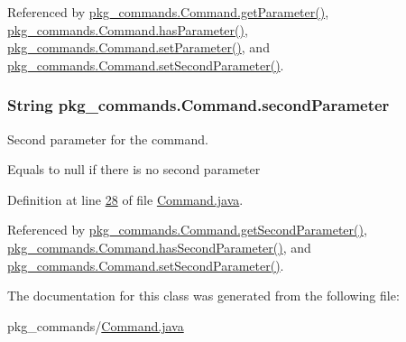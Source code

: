 Referenced by \hyperlink{Command_8java_source_l00041}{pkg\-\_\-commands.\-Command.\-get\-Parameter()}, \hyperlink{Command_8java_source_l00073}{pkg\-\_\-commands.\-Command.\-has\-Parameter()}, \hyperlink{Command_8java_source_l00057}{pkg\-\_\-commands.\-Command.\-set\-Parameter()}, and \hyperlink{Command_8java_source_l00065}{pkg\-\_\-commands.\-Command.\-set\-Second\-Parameter()}.

\hypertarget{classpkg__commands_1_1Command_a5f0b6df5ba798c9ee4446f01a0352210}{
\subsubsection[{second\-Parameter}]{\setlength{\rightskip}{0pt plus 5cm}String pkg\-\_\-commands.\-Command.\-second\-Parameter\hspace{0.3cm}{\ttfamily [private]}}}\label{classpkg__commands_1_1Command_a5f0b6df5ba798c9ee4446f01a0352210}


Second parameter for the command. 

Equals to null if there is no second parameter 

Definition at line \hyperlink{Command_8java_source_l00028}{28} of file \hyperlink{Command_8java_source}{Command.\-java}.



Referenced by \hyperlink{Command_8java_source_l00049}{pkg\-\_\-commands.\-Command.\-get\-Second\-Parameter()}, \hyperlink{Command_8java_source_l00081}{pkg\-\_\-commands.\-Command.\-has\-Second\-Parameter()}, and \hyperlink{Command_8java_source_l00065}{pkg\-\_\-commands.\-Command.\-set\-Second\-Parameter()}.



The documentation for this class was generated from the following file\-:\begin{DoxyCompactItemize}
\item 
pkg\-\_\-commands/\hyperlink{Command_8java}{Command.\-java}\end{DoxyCompactItemize}
